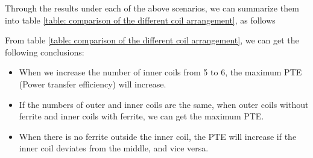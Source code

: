 \begin{table}[!t]
    \centering
    \caption{Maximum power transfer efficiency of different coil arrangements.}
    \label{table: comparison of the different coil arrangement}
\end{table}

Through the results under each of the above scenarios, we can summarize them into table \ref{table: comparison of the different coil arrangement}, as follows

From table \ref{table: comparison of the different coil arrangement}, we can get the following conclusions:
\begin{itemize}
    \item When we increase the number of inner coils from 5 to 6, the maximum PTE (Power transfer efficiency) will increase.
    \item If the numbers of outer and inner coils are the same, when outer coils without ferrite and inner coils with ferrite, we can get the maximum PTE.
    \item When there is no ferrite outside the inner coil, the PTE will increase if the inner coil deviates from the middle, and vice versa.
\end{itemize}

